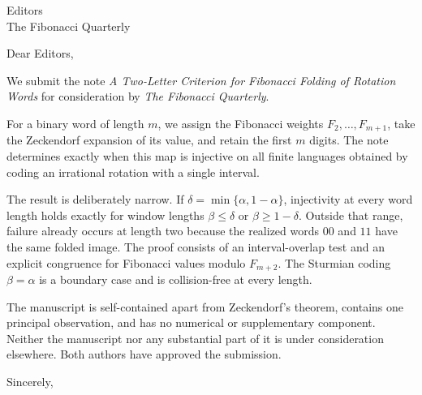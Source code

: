\documentclass[11pt]{letter}
\begin{document}
\begin{letter}{Editors \\ The Fibonacci Quarterly}

\opening{Dear Editors,}

We submit the note \emph{A Two-Letter Criterion for Fibonacci Folding of
Rotation Words} for consideration by \emph{The Fibonacci Quarterly}.

For a binary word of length \(m\), we assign the Fibonacci weights
\(F_2,\ldots,F_{m+1}\), take the Zeckendorf expansion of its value, and
retain the first \(m\) digits.  The note determines exactly when this map is
injective on all finite languages obtained by coding an irrational rotation
with a single interval.

The result is deliberately narrow.  If
\(\delta=\min\{\alpha,1-\alpha\}\), injectivity at every word length holds
exactly for window lengths \(\beta\leq\delta\) or
\(\beta\geq1-\delta\).  Outside that range, failure already occurs at length
two because the realized words \(00\) and \(11\) have the same folded image.
The proof consists of an interval-overlap test and an explicit congruence for
Fibonacci values modulo \(F_{m+2}\).  The Sturmian coding
\(\beta=\alpha\) is a boundary case and is collision-free at every length.

The manuscript is self-contained apart from Zeckendorf's theorem, contains
one principal observation, and has no numerical or supplementary component.
Neither the manuscript nor any substantial part of it is under
consideration elsewhere.  Both authors have approved the submission.

\closing{Sincerely,}

\end{letter}
\end{document}
